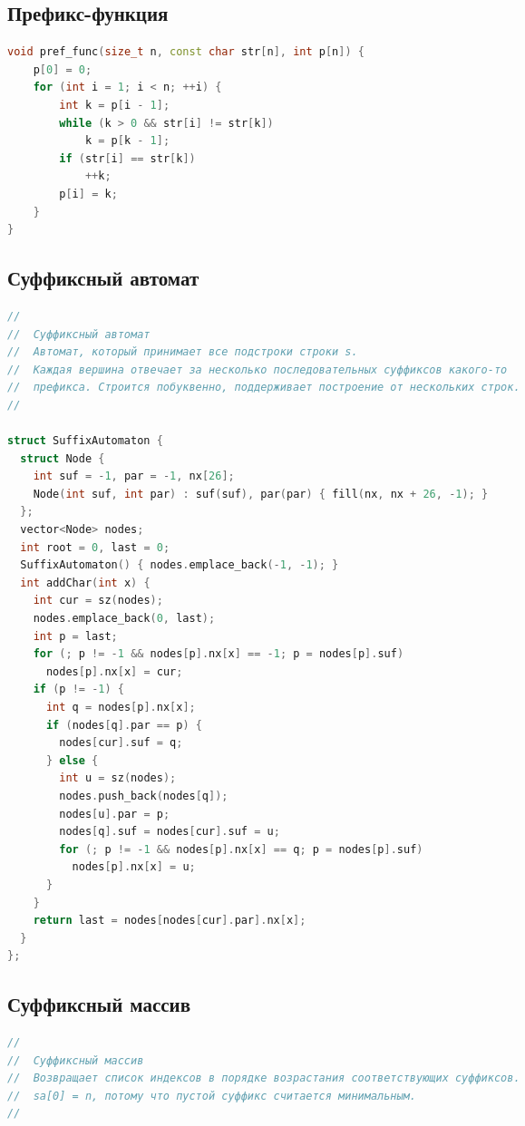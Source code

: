 \documentclass[10pt,a4paper,landscape,twosided]{extarticle}
\begin{document}
\begin{multicols}{3}
\subsection{Префикс-функция}
\begin{lstlisting}[language=C++]
void pref_func(size_t n, const char str[n], int p[n]) {
    p[0] = 0;
    for (int i = 1; i < n; ++i) {
        int k = p[i - 1];
        while (k > 0 && str[i] != str[k])
            k = p[k - 1];
        if (str[i] == str[k])
            ++k;
        p[i] = k;
    }
}
\end{lstlisting}

\subsection{Суффиксный автомат}
\begin{lstlisting}[language=C++]
//
//  Суффиксный автомат
//  Автомат, который принимает все подстроки строки s.
//  Каждая вершина отвечает за несколько последовательных суффиксов какого-то
//  префикса. Строится побуквенно, поддерживает построение от нескольких строк.
//

struct SuffixAutomaton {
  struct Node {
    int suf = -1, par = -1, nx[26];
    Node(int suf, int par) : suf(suf), par(par) { fill(nx, nx + 26, -1); }
  };
  vector<Node> nodes;
  int root = 0, last = 0;
  SuffixAutomaton() { nodes.emplace_back(-1, -1); }
  int addChar(int x) {
    int cur = sz(nodes);
    nodes.emplace_back(0, last);
    int p = last;
    for (; p != -1 && nodes[p].nx[x] == -1; p = nodes[p].suf)
      nodes[p].nx[x] = cur;
    if (p != -1) {
      int q = nodes[p].nx[x];
      if (nodes[q].par == p) {
        nodes[cur].suf = q;
      } else {
        int u = sz(nodes);
        nodes.push_back(nodes[q]);
        nodes[u].par = p;
        nodes[q].suf = nodes[cur].suf = u;
        for (; p != -1 && nodes[p].nx[x] == q; p = nodes[p].suf)
          nodes[p].nx[x] = u;
      }
    }
    return last = nodes[nodes[cur].par].nx[x];
  }
};
\end{lstlisting}

\subsection{Суффиксный массив}
\begin{lstlisting}[language=C++]
//
//  Суффиксный массив
//  Возвращает список индексов в порядке возрастания соответствующих суффиксов.
//  sa[0] = n, потому что пустой суффикс считается минимальным.
//


\end{lstlisting}
\end{multicols}
\end{document}

